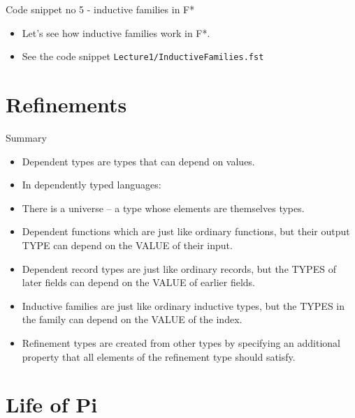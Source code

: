 \documentclass{beamer}
\newcommand{\m}[1]{\texttt{#1}}
\begin{document}
\begin{frame}{Code snippet no 5 - inductive families in F*}
\begin{itemize}
	\item Let's see how inductive families work in F*.
	\item See the code snippet \m{Lecture1/InductiveFamilies.fst}
\end{itemize}
\end{frame}

\section{Refinements}

\begin{frame}{Summary}
\begin{itemize}
	\item Dependent types are types that can depend on values.
	\item In dependently typed languages:
	\item There is a universe -- a type whose elements are themselves types.
	\item Dependent functions which are just like ordinary functions, but their output TYPE can depend on the VALUE of their input.
	\item Dependent record types are just like ordinary records, but the TYPES of later fields can depend on the VALUE of earlier fields.
	\item Inductive families are just like ordinary inductive types, but the TYPES in the family can depend on the VALUE of the index.
	\item Refinement types are created from other types by specifying an additional property that all elements of the refinement type should satisfy.
\end{itemize}
\end{frame}

\section{Life of Pi}
\end{document}
